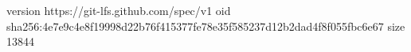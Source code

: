 version https://git-lfs.github.com/spec/v1
oid sha256:4e7e9c4e8f19998d22b76f415377fe78e35f585237d12b2dad4f8f055fbc6e67
size 13844
